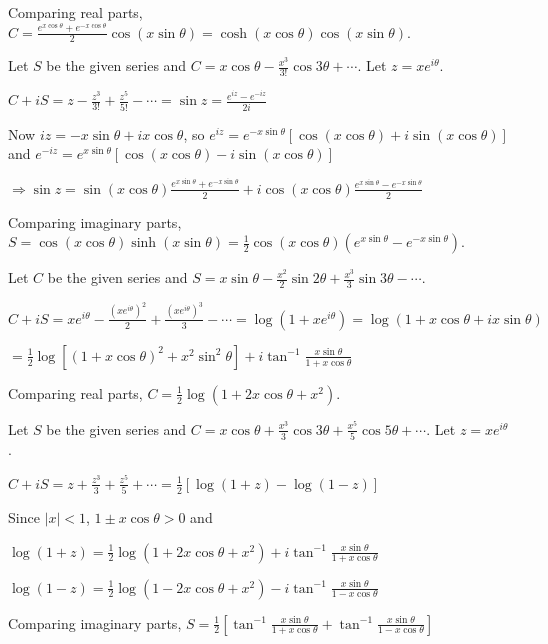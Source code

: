   Comparing real parts, $C = \frac{e^{x\cos\theta} + e^{-x\cos\theta}}{2}\cos(x\sin\theta) =
  \cosh(x\cos\theta)\cos(x\sin\theta)$.
\item Let $S$ be the given series and $C = x\cos\theta - \frac{x^3}{3!}\cos3\theta + \cdots$. Let $z =
  xe^{i\theta}$.

  $C + iS = z - \frac{z^3}{3!} + \frac{z^5}{5!} - \cdots = \sin z = \frac{e^{iz} - e^{-iz}}{2i}$

  Now $iz = -x\sin\theta + ix\cos\theta$, so $e^{iz} = e^{-x\sin\theta}[\cos(x\cos\theta) +
  i\sin(x\cos\theta)]$ and $e^{-iz} = e^{x\sin\theta}[\cos(x\cos\theta) - i\sin(x\cos\theta)]$

  $\Rightarrow \sin z = \sin(x\cos\theta)\frac{e^{x\sin\theta} + e^{-x\sin\theta}}{2} +
  i\cos(x\cos\theta)\frac{e^{x\sin\theta} - e^{-x\sin\theta}}{2}$

  Comparing imaginary parts, $S = \cos(x\cos\theta)\sinh(x\sin\theta) =
  \frac{1}{2}\cos(x\cos\theta)\left(e^{x\sin\theta} - e^{-x\sin\theta}\right)$.
\item Let $C$ be the given series and $S = x\sin\theta - \frac{x^2}{2}\sin2\theta + \frac{x^3}{3}\sin3\theta
  - \cdots$.

  $C + iS = xe^{i\theta} - \frac{\left(xe^{i\theta}\right)^2}{2} + \frac{\left(xe^{i\theta}\right)^3}{3} -
  \cdots = \log\left(1 + xe^{i\theta}\right) = \log(1 + x\cos\theta + ix\sin\theta)$

  $= \frac{1}{2}\log\left[(1 + x\cos\theta)^2 + x^2\sin^2\theta\right] + i\tan^{-1}\frac{x\sin\theta}{1 +
    x\cos\theta}$

  Comparing real parts, $C = \frac{1}{2}\log\left(1 + 2x\cos\theta + x^2\right)$.
\item Let $S$ be the given series and $C = x\cos\theta + \frac{x^3}{3}\cos3\theta + \frac{x^5}{5}\cos5\theta
  + \cdots$. Let $z = xe^{i\theta}$.

  $C + iS = z + \frac{z^3}{3} + \frac{z^5}{5} + \cdots = \frac{1}{2}[\log(1 + z) - \log(1 - z)]$

  Since $|x| < 1$, $1 \pm x\cos\theta > 0$ and

  $\log(1 + z) = \frac{1}{2}\log\left(1 + 2x\cos\theta + x^2\right) + i\tan^{-1}\frac{x\sin\theta}{1 +
    x\cos\theta}$

  $\log(1 - z) = \frac{1}{2}\log\left(1 - 2x\cos\theta + x^2\right) - i\tan^{-1}\frac{x\sin\theta}{1 -
    x\cos\theta}$

  Comparing imaginary parts, $S = \frac{1}{2}\left[\tan^{-1}\frac{x\sin\theta}{1 + x\cos\theta} +
  \tan^{-1}\frac{x\sin\theta}{1 - x\cos\theta}\right]$

